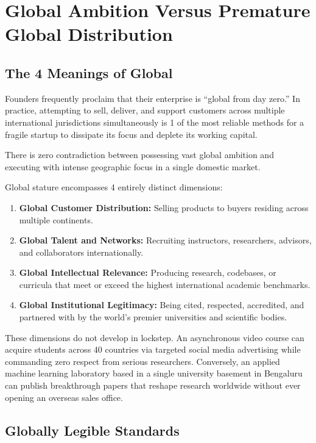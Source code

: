 \section{Global Ambition Versus Premature Global Distribution}

\subsection{The 4 Meanings of Global}

Founders frequently proclaim that their enterprise is ``global from day zero.'' In practice, attempting to sell, deliver, and support customers across multiple international jurisdictions simultaneously is 1 of the most reliable methods for a fragile startup to dissipate its focus and deplete its working capital.

There is zero contradiction between possessing vast global ambition and executing with intense geographic focus in a single domestic market.

Global stature encompasses 4 entirely distinct dimensions:

\begin{enumerate}[leftmargin=12pt,itemsep=2pt,topsep=1pt,parsep=0pt]
  \item \textbf{Global Customer Distribution:} Selling products to buyers residing across multiple continents.
  \item \textbf{Global Talent and Networks:} Recruiting instructors, researchers, advisors, and collaborators internationally.
  \item \textbf{Global Intellectual Relevance:} Producing research, codebases, or curricula that meet or exceed the highest international academic benchmarks.
  \item \textbf{Global Institutional Legitimacy:} Being cited, respected, accredited, and partnered with by the world's premier universities and scientific bodies.
\end{enumerate}

These dimensions do not develop in lockstep. An asynchronous video course can acquire students across 40 countries via targeted social media advertising while commanding zero respect from serious researchers. Conversely, an applied machine learning laboratory based in a single university basement in Bengaluru can publish breakthrough papers that reshape research worldwide without ever opening an overseas sales office.

\subsection{Globally Legible Standards}

